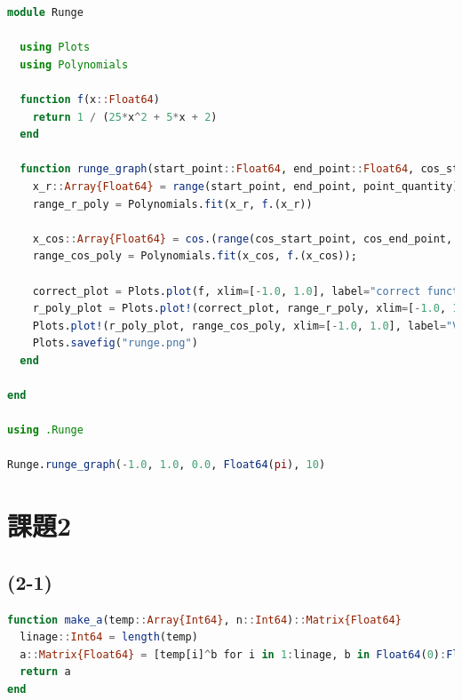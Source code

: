 \documentclass[uplatex, dvipdfmx, a4j,11pt]{jsarticle}
\begin{document}
\begin{lstlisting}[title={(1-1)}, label=code:in, language=Julia]
module Runge

  using Plots
  using Polynomials

  function f(x::Float64)
    return 1 / (25*x^2 + 5*x + 2)
  end

  function runge_graph(start_point::Float64, end_point::Float64, cos_start_point::Float64, cos_end_point::Float64, point_quantity::Int64)
    x_r::Array{Float64} = range(start_point, end_point, point_quantity)
    range_r_poly = Polynomials.fit(x_r, f.(x_r))

    x_cos::Array{Float64} = cos.(range(cos_start_point, cos_end_point, point_quantity));
    range_cos_poly = Polynomials.fit(x_cos, f.(x_cos));

    correct_plot = Plots.plot(f, xlim=[-1.0, 1.0], label="correct function", legend=:bottomright)
    r_poly_plot = Plots.plot!(correct_plot, range_r_poly, xlim=[-1.0, 1.0], label="Value taken at equal intervals in the interval [-1,1]", legend=:bottomright)
    Plots.plot!(r_poly_plot, range_cos_poly, xlim=[-1.0, 1.0], label="Value of cos(θi) when θi is taken equally spaced in the interval [0,π]", legend=:bottomright)
    Plots.savefig("runge.png")
  end

end

using .Runge

Runge.runge_graph(-1.0, 1.0, 0.0, Float64(pi), 10)
\end{lstlisting}

\section*{課題2}
\subsection*{(2-1)}
\begin{lstlisting}[title={(２-1)}, label=code:in, language=Julia]
function make_a(temp::Array{Int64}, n::Int64)::Matrix{Float64}
  linage::Int64 = length(temp)
  a::Matrix{Float64} = [temp[i]^b for i in 1:linage, b in Float64(0):Float64(n)]
  return a
end
\end{lstlisting}
\end{document}
